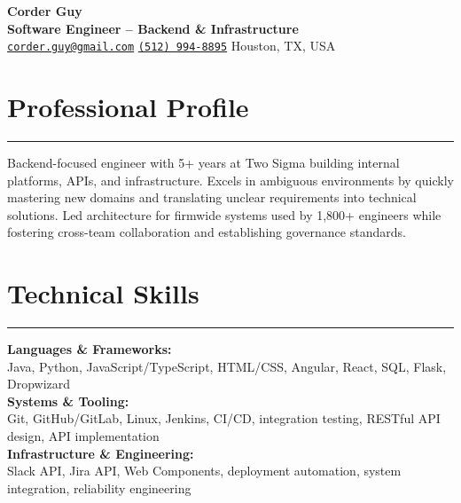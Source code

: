 \documentclass[10pt]{article}
\begin{document}
\begin{center}
  {\Huge\textbf{Corder Guy}} \\
  \vspace{0.7em}
  {\Large\textbf{Software Engineer -- Backend \& Infrastructure}} \\
  \href{mailto:corder.guy@gmail.com}{\texttt{corder.guy@gmail.com}}
  \textbar{}
  \href{tel:+15129948895}{\texttt{(512) 994-8895}}
  \textbar{}
  Houston, TX, USA
\end{center}

\newcommand{\sectionline}{\vspace{-0.75em}\hrule\vspace{0.5em}}
\newcommand{\resumesection}[1]{\section*{{\fontsize{17}{19}\selectfont #1}} \sectionline}

\resumesection{Professional Profile}
Backend-focused engineer with 5+ years at Two Sigma building internal platforms, APIs, and infrastructure. Excels in ambiguous environments by quickly mastering new domains and translating unclear requirements into technical solutions. Led architecture for firmwide systems used by 1,800+ engineers while fostering cross-team collaboration and establishing governance standards.

\newcommand{\skillsection}[2]{\textbf{#1:} \\ \hspace*{1em} #2}

\resumesection{Technical Skills}
\skillsection{Languages \& Frameworks}{}
Java, Python, JavaScript/TypeScript, HTML/CSS, Angular, React, SQL, Flask, Dropwizard \\
\skillsection{Systems \& Tooling}{}
Git, GitHub/GitLab, Linux, Jenkins, CI/CD, integration testing, RESTful API design, API implementation \\
\skillsection {Infrastructure \& Engineering}{}
Slack API, Jira API, Web Components, deployment automation, system integration, reliability engineering


\newcommand{\sectionentry}[2]{\textbf{#1} \hfill \emph{#2}}

\newcommand{\roleentry}[1]{\textbf{#1}}

\newenvironment{role}[1]{
  \roleentry{#1}
  \begin{itemize}[left=1.5em]
}{
  \end{itemize}
}
\end{document}
